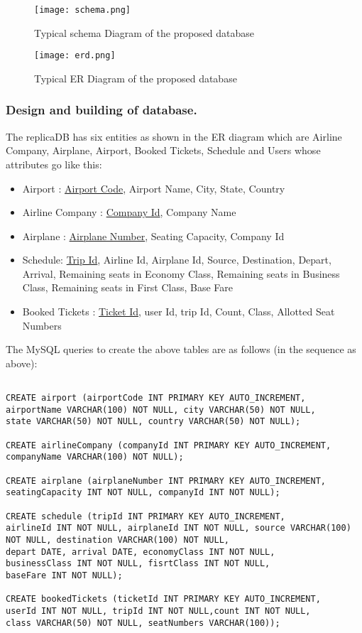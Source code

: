 \documentclass[hidelinks=true]{article}
\begin{document}
\begin{figure}
\texttt{[image: schema.png]}
\caption{Typical schema Diagram of the proposed database}
\end{figure}
\begin{figure}
\texttt{[image: erd.png]}
\caption{Typical ER Diagram of the proposed database}
\end{figure}


\pagebreak
\subsubsection{Design and building of database.}
The replicaDB has six entities as shown in the ER diagram which are Airline Company, Airplane, Airport, Booked Tickets, Schedule and Users whose attributes go like this:
\begin{itemize}
\item {Airport : \underline{Airport Code}, Airport Name, City, State, Country}
\item {Airline Company : \underline{Company Id}, Company Name}
\item {Airplane : \underline{Airplane Number}, Seating Capacity, Company Id}
\item{Schedule: \underline{Trip Id}, Airline Id, Airplane Id, Source, Destination, Depart, Arrival, Remaining seats in Economy Class, Remaining seats in Business Class, Remaining seats in First Class, Base Fare}
\item{Booked Tickets : \underline{Ticket Id}, user Id, trip Id, Count, Class, Allotted Seat Numbers}
\end{itemize}

\vspace*{10pt}
The MySQL queries to create the above tables are as follows (in the sequence as above):
\vspace{10pt}
\normalsize
\begin{verbatim}

CREATE airport (airportCode INT PRIMARY KEY AUTO_INCREMENT,
airportName VARCHAR(100) NOT NULL, city VARCHAR(50) NOT NULL,
state VARCHAR(50) NOT NULL, country VARCHAR(50) NOT NULL);

CREATE airlineCompany (companyId INT PRIMARY KEY AUTO_INCREMENT,
companyName VARCHAR(100) NOT NULL);

CREATE airplane (airplaneNumber INT PRIMARY KEY AUTO_INCREMENT,
seatingCapacity INT NOT NULL, companyId INT NOT NULL);

CREATE schedule (tripId INT PRIMARY KEY AUTO_INCREMENT,
airlineId INT NOT NULL, airplaneId INT NOT NULL, source VARCHAR(100) 
NOT NULL, destination VARCHAR(100) NOT NULL,
depart DATE, arrival DATE, economyClass INT NOT NULL,
businessClass INT NOT NULL, fisrtClass INT NOT NULL, 
baseFare INT NOT NULL);

CREATE bookedTickets (ticketId INT PRIMARY KEY AUTO_INCREMENT,
userId INT NOT NULL, tripId INT NOT NULL,count INT NOT NULL,
class VARCHAR(50) NOT NULL, seatNumbers VARCHAR(100));
\end{verbatim}
\end{document}
